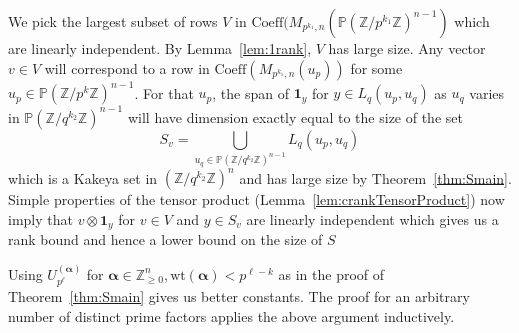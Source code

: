 \documentclass[11pt]{article}
\numberwithin{equation}{section}
\def\Z{{\mathbb{Z}}}
\def\P{{\mathbb{P}}}
\def\Ind{{\mathbf{1}}}
\def\balpha{{\bm \alpha}}
\def\Coeff{\text{Coeff}}
\begin{document}
We pick the largest subset of rows $V$ in $\Coeff(M_{p^{k_1},n}(\P (\Z/p^{k_1}\Z)^{n-1})$ which are linearly independent. By Lemma~\ref{lem:1rank}, $V$ has large size. Any vector $v\in V$ will correspond to a row in $\Coeff(M_{p^{k_1},n}(u_p))$ for some $u_p\in \P (\Z/p^k\Z)^{n-1}$. For that $u_p$, the span of $\Ind_y$ for $y\in L_q(u_p,u_q)$ as $u_q$ varies in $\P (\Z/q^{k_2}\Z)^{n-1} $ will have dimension exactly equal to the size of the set 
$$S_v=\bigcup\limits_{u_q\in \P (\Z/q^{k_2}\Z)^{n-1} } L_q(u_p,u_q)$$ 
which is a Kakeya set in $(\Z/q^{k_2}\Z)^n$ and has large size by Theorem~\ref{thm:Smain}. Simple properties of the tensor product (Lemma~\ref{lem:crankTensorProduct}) now imply that $v\otimes \Ind_y$ for $v\in V$ and $y\in S_v$ are linearly independent which gives us a rank bound and hence a lower bound on the size of $S$

Using $U^{(\balpha)}_{p^\ell}$ for $\balpha\in \Z_{\ge 0}^n,\text{wt}(\balpha)<p^{\ell-k}$ as in the proof of Theorem~\ref{thm:Smain} gives us better constants. The proof for an arbitrary number of distinct prime factors applies the above argument inductively.
\end{document}
